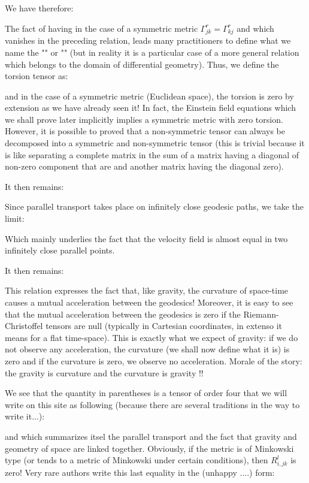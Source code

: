 	We have therefore:
	
	\begin{tcolorbox}[title=Remark,colframe=black,arc=10pt]
	The fact of having in the case of a symmetric metric $\Gamma_{jk}^r=\Gamma_{kj}^r$ and which vanishes in the preceding relation, leads many practitioners to define what we name the "\label{torsion tensor}" or "" (but in reality it is a particular case of a more general relation which belongs to the domain of differential geometry). Thus, we define the torsion tensor as:
	
	and in the case of a symmetric metric (Euclidean space), the torsion is zero by extension as we have already seen it! In fact, the Einstein field equations which we shall prove later implicitly implies a symmetric metric with zero torsion. However, it is possible to proved that a non-symmetric tensor can always be decomposed into a symmetric and non-symmetric tensor (this is trivial because it is like separating a complete matrix in the sum of a matrix having a diagonal of non-zero component that are and another matrix having the diagonal zero).
	\end{tcolorbox}
	It then remains:
	
	Since parallel transport takes place on infinitely close geodesic paths, we take the limit:
	
	Which mainly underlies the fact that the velocity field is almost equal in two infinitely close parallel points.

	It then remains:
	
	This relation expresses the fact that, like gravity, the curvature of space-time causes a mutual acceleration between the geodesics! Moreover, it is easy to see that the mutual acceleration between the geodesics is zero if the Riemann-Christoffel tensors are null (typically in Cartesian coordinates, in extenso it means for a flat time-space). This is exactly what we expect of gravity: if we do not observe any acceleration, the curvature (we shall now define what it is) is zero and if the curvature is zero, we observe no acceleration. Morale of the story: the gravity is curvature and the curvature is gravity !!

	We see that the quantity in parentheses is a tensor of order four that we will write on this site as following (because there are several traditions in the way to write it...):
	
	and which summarizes itsel the parallel transport and the fact that gravity and geometry of space are linked together. Obviously, if the metric is of Minkowski type (or tends to a metric of Minkowski under certain conditions), then $R_{i,jk}^l$ is zero! Very rare authors write this last equality in the (unhappy ....) form:
	
